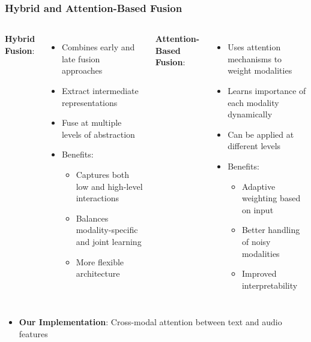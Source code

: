 \documentclass{beamer}
\begin{document}
\begin{frame}
\frametitle{Hybrid and Attention-Based Fusion}
\begin{columns}
\textbf{Hybrid Fusion}:
\begin{itemize}
    \item Combines early and late fusion approaches
    \item Extract intermediate representations
    \item Fuse at multiple levels of abstraction
    \item Benefits:
    \begin{itemize}
        \item Captures both low and high-level interactions
        \item Balances modality-specific and joint learning
        \item More flexible architecture
    \end{itemize}
\end{itemize}

\textbf{Attention-Based Fusion}:
\begin{itemize}
    \item Uses attention mechanisms to weight modalities
    \item Learns importance of each modality dynamically
    \item Can be applied at different levels
    \item Benefits:
    \begin{itemize}
        \item Adaptive weighting based on input
        \item Better handling of noisy modalities
        \item Improved interpretability
    \end{itemize}
\end{itemize}
\end{columns}

\begin{itemize}
    \item \textbf{Our Implementation}: Cross-modal attention between text and audio features
\end{itemize}
\end{frame}
\end{document}
